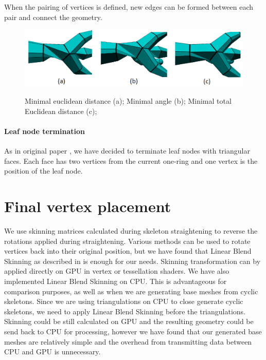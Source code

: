 When the pairing of vertices is defined, new edges can be formed between each pair and connect the geometry.

\begin{figure}[h]
    \centering
    \includegraphics[width=\textwidth]{images/join_pairing.png}
    \label{fig:join_pairing_ilu}
    \caption[BNP joining pairing]{Minimal euclidean distance (a); Minimal angle (b); Minimal total Euclidean distance (c);}
\end{figure}

\paragraph{Leaf node termination}
As in original paper \cite{sqm}, we have decided to terminate leaf nodes with triangular faces. Each face has two vertices from the current one-ring and one vertex is the position of the leaf node.

\section{Final vertex placement}\label{sec:fvp}
We use skinning matrices calculated during skeleton straightening to reverse the rotations applied during straightening.
Various methods can be used to rotate vertices back into their original position, but we have found that Linear Blend Skinning as described in \cite{Kavan-07-SDQ} is enough for our needs.
Skinning transformation can by applied directly on GPU in vertex or tessellation shaders.
We have also implemented Linear Blend Skinning on CPU.
This is advantageous for comparison purposes, as well as when we are generating base meshes from cyclic skeletons.
Since we are using triangulations on CPU to close generate cyclic skeletons, we need to apply Linear Blend Skinning before the triangulations.
Skinning could be still calculated on GPU and the resulting geometry could be send back to CPU for processing, however we have found that our generated base meshes are relatively simple and the overhead from transmitting data between CPU and GPU is unnecessary.


